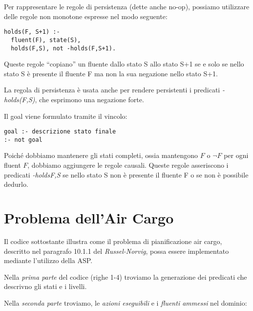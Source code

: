 Per rappresentare le regole di persistenza (dette anche no-op), possiamo utilizzare delle regole non monotone espresse nel modo seguente:

\begin{lstlisting}
holds(F, S+1) :-
  fluent(F), state(S),
  holds(F,S), not -holds(F,S+1).
\end{lstlisting}

Queste regole ``copiano'' un fluente dallo stato S allo stato S+1 se e solo se nello stato S è presente il fluente F ma non la sua negazione nello stato S+1.

La regola di persistenza è usata anche per rendere persistenti i predicati \emph{-holds(F,S)}, che esprimono una negazione forte.

Il goal viene formulato tramite il vincolo:

\begin{lstlisting}
goal :- descrizione stato finale
:- not goal
\end{lstlisting}

Poiché dobbiamo mantenere gli stati completi, ossia mantengono $F$ o $\neg{F}$ per ogni fluent $F$, dobbiamo aggiungere le regole causali. Queste regole asseriscono i predicati \emph{-holds{F,S}} se nello stato S non è presente il fluente F o se non è possibile dedurlo.

\section{Problema dell'Air Cargo}

Il codice sottostante illustra come il problema di pianificazione air cargo, descritto nel paragrafo 10.1.1 del \emph{Russel-Norvig}, possa essere implementato mediante l’utilizzo della ASP.

Nella \emph{prima parte} del codice (righe 1-4) troviamo la generazione dei predicati che descrivno gli stati e i livelli.

Nella \emph{seconda parte} troviamo, le \emph{azioni eseguibili} e i \emph{fluenti ammessi} nel dominio:

